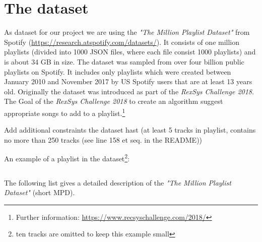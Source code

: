 \section{The dataset}

As dataset for our project we are using the \textit{"The Million Playlist Dataset"} \citet{recsysChallenge} from Spotify (\url{https://research.atspotify.com/datasets/}). It consists of one million playlists (divided into 1000 JSON files, where each file consist 1000 playlists) and is about 34 GB in size. The dataset was sampled from over four billion public playlists on Spotify. It includes only playlists which were created between January 2010 and November 2017 by US Spotify users that are at least 13 years old. Originally the dataset was introduced as part of the \textit{RexSys Challenge 2018}. The Goal of the \textit{RexSys Challenge 2018} to create an algorithm suggest appropriate songs to add to a playlist.\footnote{Further information: \url{https://www.recsyschallenge.com/2018/}}

Add additional constraints the dataset hast (at least 5 tracks in playlist, contains no more than 250 tracks (see line 158 et seq. in the README))\answerTODO{}

An example of a playlist in the dataset\footnote{ten tracks are omitted to keep this example small}:
\inputminted{json}{assets/example.json}

The following list gives a detailed description of the \textit{"The Million Playlist Dataset"} (short MPD).

